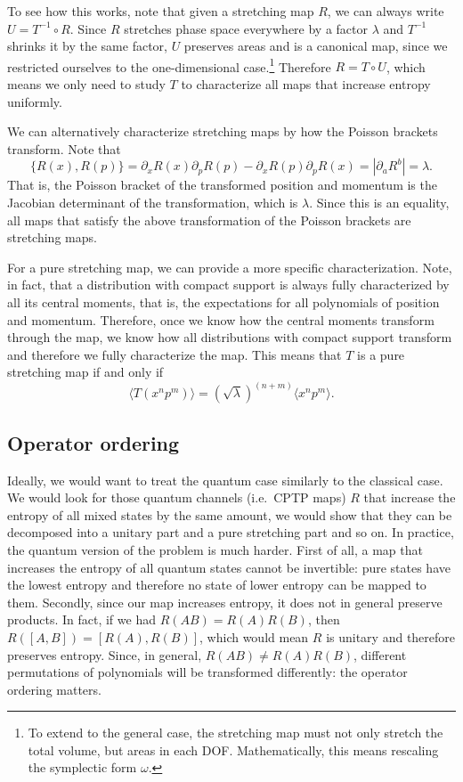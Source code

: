 \documentclass{article}
\begin{document}
To see how this works, note that given a stretching map $R$, we can always write $U = T^{-1} \circ R$. Since $R$ stretches phase space everywhere by a factor $\lambda$ and $T^{-1}$ shrinks it by the same factor, $U$ preserves areas and is a canonical map, since we restricted ourselves to the one-dimensional case.\footnote{To extend to the general case, the stretching map must not only stretch the total volume, but areas in each DOF. Mathematically, this means rescaling the symplectic form $\omega$.} Therefore $R = T \circ U$, which means we only need to study $T$ to characterize all maps that increase entropy uniformly.

We can alternatively characterize stretching maps by how the  Poisson brackets transform. Note that
\begin{equation}
    \{R(x),R(p)\} = \partial_x R(x) \partial_p R(p) - \partial_x R(p) \partial_p R(x) = | \partial_a R^b | = \lambda.
\end{equation}
That is, the Poisson bracket of the transformed position and momentum is the Jacobian determinant of the transformation, which is $\lambda$. Since this is an equality, all maps that satisfy the above transformation of the Poisson brackets are stretching maps.

For a pure stretching map, we can provide a more specific characterization. Note, in fact, that a distribution with compact support is always fully characterized by all its central moments, that is, the expectations for all polynomials of position and momentum. Therefore, once we know how the central moments transform through the map, we know how all distributions with compact support transform and therefore we fully characterize the map. This means that $T$ is a pure stretching map if and only if
\begin{equation}
    \langle T(x^np^m) \rangle = (\sqrt{\lambda})^{(n+m)} \langle x^n p^m \rangle.
\end{equation}

\subsection{Operator ordering}

Ideally, we would want to treat the quantum case similarly to the classical case. We would look for those quantum channels (i.e.~CPTP maps) $R$ that increase the entropy of all mixed states by the same amount, we would show that they can be decomposed into a unitary part and a pure stretching part and so on. In practice, the quantum version of the problem is much harder. First of all, a map that increases the entropy of all quantum states cannot be invertible: pure states have the lowest entropy and therefore no state of lower entropy can be mapped to them. Secondly, since our map increases entropy, it does not in general preserve products. In fact, if we had $R(AB) = R(A)R(B)$, then $R([A,B]) = [R(A),R(B)]$, which would mean $R$ is unitary and therefore preserves entropy. Since, in general, $R(AB) \neq R(A)R(B)$, different permutations of polynomials will be transformed differently: the operator ordering matters.
\end{document}
